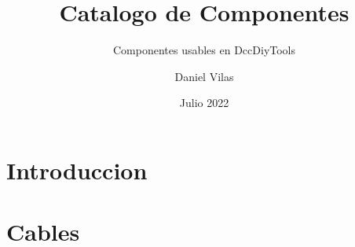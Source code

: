 \documentclass[spanish]{DccDiyTools/DccDiyTools}
\title{Catalogo de Componentes}
\subtitle{Componentes usables en DccDiyTools}
\author{Daniel Vilas}
\date{Julio 2022}
\begin{document}
\maketitle
\newpage
\section{Introduccion}


\newpage
\section{Cables}
%
\end{document}
